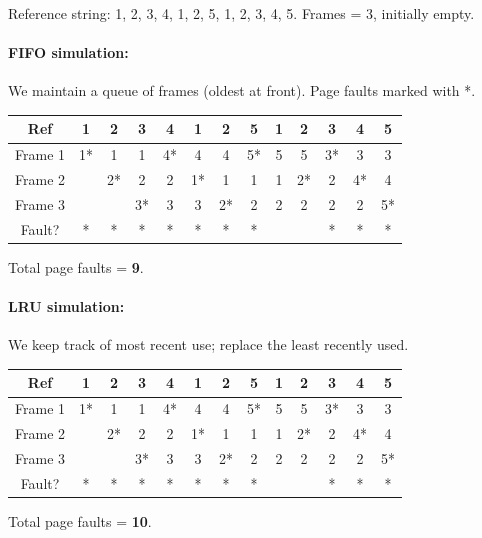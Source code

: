 \documentclass[11pt]{article}
\begin{document}
\begin{corrige}
Reference string: 1, 2, 3, 4, 1, 2, 5, 1, 2, 3, 4, 5. Frames = 3, initially empty.

\paragraph{FIFO simulation:}
We maintain a queue of frames (oldest at front). Page faults marked with *.

\begin{center}
\begin{tabular}{|c|cccccccccccc|}
\hline
Ref & 1 & 2 & 3 & 4 & 1 & 2 & 5 & 1 & 2 & 3 & 4 & 5 \\
\hline
Frame 1 & 1* & 1 & 1 & 4* & 4 & 4 & 5* & 5 & 5 & 3* & 3 & 3 \\
Frame 2 & & 2* & 2 & 2 & 1* & 1 & 1 & 1 & 2* & 2 & 4* & 4 \\
Frame 3 & & & 3* & 3 & 3 & 2* & 2 & 2 & 2 & 2 & 2 & 5* \\
\hline
Fault? & * & * & * & * & * & * & * &  &  & * & * & * \\
\hline
\end{tabular}
\end{center}
Total page faults = \textbf{9}.

\paragraph{LRU simulation:}
We keep track of most recent use; replace the least recently used.

\begin{center}
\begin{tabular}{|c|cccccccccccc|}
\hline
Ref & 1 & 2 & 3 & 4 & 1 & 2 & 5 & 1 & 2 & 3 & 4 & 5 \\
\hline
Frame 1 & 1* & 1 & 1 & 4* & 4 & 4 & 5* & 5 & 5 & 3* & 3 & 3 \\
Frame 2 & & 2* & 2 & 2 & 1* & 1 & 1 & 1 & 2* & 2 & 4* & 4 \\
Frame 3 & & & 3* & 3 & 3 & 2* & 2 & 2 & 2 & 2 & 2 & 5* \\
\hline
Fault? & * & * & * & * & * & * & * &  &  & * & * & * \\
\hline
\end{tabular}
\end{center}
Total page faults = \textbf{10}.


\end{corrige}
\end{document}
